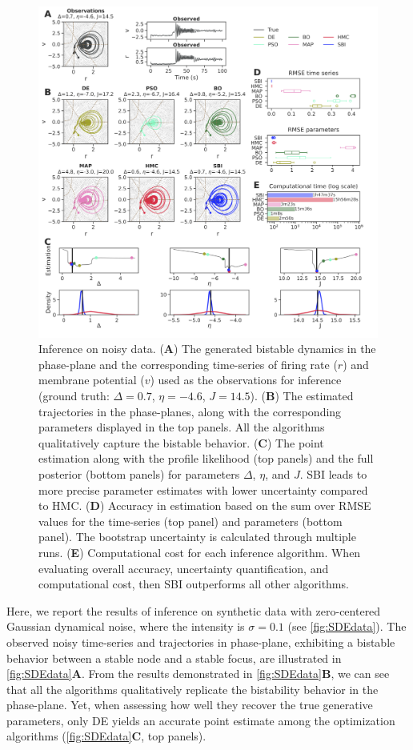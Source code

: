 \documentclass[preprint,11pt,authoryear]{elsarticle}
\begin{document}
\begin{figure}[p]
    \centering
    \includegraphics[width=\linewidth]{Figs/Fig2.png}
    \caption{Inference on noisy data.  (\textbf{A}) The generated bistable dynamics in the phase-plane and the corresponding time-series of firing rate ($r$) and membrane potential ($v$) used as the observations for inference (ground truth: $\Delta=0.7$, $\eta=-4.6$, $J=14.5$).  (\textbf{B}) The estimated trajectories in the phase-planes, along with the corresponding parameters displayed in the top panels. All the algorithms qualitatively capture the bistable behavior. (\textbf{C}) The point estimation along with the profile likelihood (top panels) and the full posterior (bottom panels) for parameters $\Delta$, $\eta$, and $J$. SBI leads to more precise parameter estimates with lower uncertainty compared to HMC. (\textbf{D}) Accuracy in estimation based on the sum over RMSE values for the time-series (top panel) and parameters (bottom panel). The bootstrap uncertainty is calculated through multiple runs. (\textbf{E}) Computational cost for each inference algorithm.  When evaluating overall accuracy, uncertainty quantification, and computational cost, then SBI outperforms all other algorithms.
    }
    \label{fig:SDEdata}
\end{figure}


Here, we report the results of inference on synthetic data with zero-centered Gaussian dynamical noise, where the intensity is $\sigma = 0.1$  (see \autoref{fig:SDEdata}).
The observed noisy time-series and trajectories in phase-plane, exhibiting a bistable behavior between a stable node and a stable focus, are illustrated in \autoref{fig:SDEdata}\textbf{A}. From the results demonstrated in \autoref{fig:SDEdata}\textbf{B}, we can see that all the algorithms qualitatively replicate the bistability behavior in the phase-plane. Yet, when assessing how well they recover the true generative parameters, only DE yields an accurate point estimate among the optimization algorithms (\autoref{fig:SDEdata}\textbf{C}, top panels). 
\end{document}
